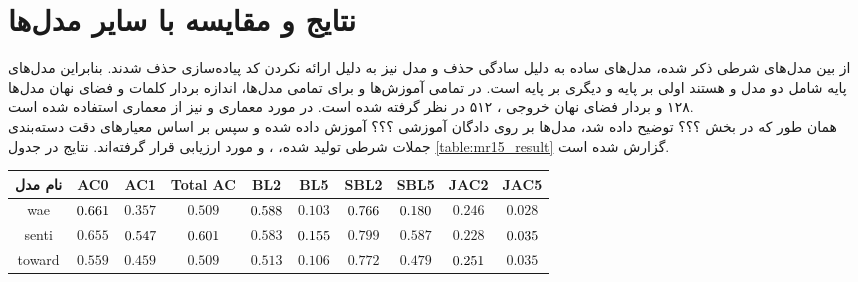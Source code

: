 \section{نتایج و مقایسه با سایر مدل‌ها}
از بین مدل‌های شرطی ذکر شده، مدل‌های ساده به دلیل سادگی حذف و مدل  نیز به دلیل ارائه نکردن کد پیاده‌سازی حذف شدند. بنابراین مدل‌های پایه شامل دو مدل \towardctg{} و \sentigan{} هستند اولی بر پایه \vae{} و دیگری بر پایه \gan{} است. در تمامی آموزش‌ها و برای تمامی مدل‌ها، اندازه بردار \embedding{} کلمات و فضای نهان مدل‌ها ۱۲۸ و بردار فضای نهان خروجی \encoder{}، ۵۱۲ در نظر گرفته شده است. در مورد معماری \encoder{} و \decoder{} نیز از معماری \transformer{} استفاده شده است.
\\
همان طور که در بخش ؟؟؟ توضیح داده شد، مدل‌ها بر روی دادگان آموزشی ؟؟؟ آموزش داده شده و سپس بر اساس معیارهای  دقت دسته‌بندی جملات شرطی تولید شده، \bleu{} ، \selfbleu{} و \jaccard{} مورد ارزیابی قرار گرفته‌اند. نتایج در جدول \ref{table:mr15_result} گزارش شده است.
\begin{table*}[!htb]
    \centering
    \caption{ارزیابی مدل‌های پایه و ارائه شده بر اساس معیار‌های مختلف}\label{table:mr15_result}
    \small\tabcolsep=0.07cm
    \begin{tabular}{||c||c c c|c c|c c|c c||}\hline\hline نام مدل	& AC0	& AC1	& Total AC	& BL2	& BL5	& SBL2	& SBL5	& JAC2	& JAC5\\
        \hline\hline
        wae	& $\cellcolor{gray!25}0.661$	& $0.357$	& $0.509$	& $\cellcolor{gray!25}0.588$	& $0.103$	& $\cellcolor{gray!25}0.766$	& $\cellcolor{gray!25}0.180$	& $0.246$	& $0.028$ \\
        \hline
        senti	& $0.655$	& $\cellcolor{gray!25}0.547$	& $\cellcolor{gray!25}0.601$	& $0.583$	& $\cellcolor{gray!25}0.155$	& $0.799$	& $0.587$	& $0.228$	& $\cellcolor{gray!25}0.035$ \\
        \hline
        toward	& $0.559$	& $0.459$	& $0.509$	& $0.513$	& $0.106$	& $0.772$	& $0.479$	& $\cellcolor{gray!25}0.251$	& $0.035$ \\
        \hline
        \hline\end{tabular}\normalsize 
\end{table*}